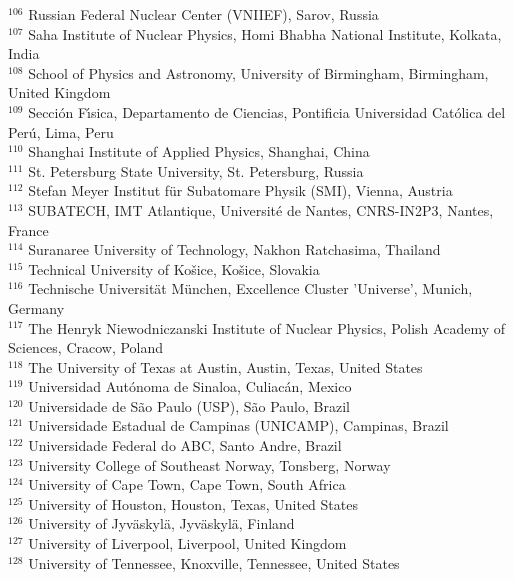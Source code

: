 \begin{flushleft}
$^{106}$ Russian Federal Nuclear Center (VNIIEF), Sarov, Russia\\
$^{107}$ Saha Institute of Nuclear Physics, Homi Bhabha National Institute, Kolkata, India\\
$^{108}$ School of Physics and Astronomy, University of Birmingham, Birmingham, United Kingdom\\
$^{109}$ Secci\'{o}n F\'{\i}sica, Departamento de Ciencias, Pontificia Universidad Cat\'{o}lica del Per\'{u}, Lima, Peru\\
$^{110}$ Shanghai Institute of Applied Physics, Shanghai, China\\
$^{111}$ St. Petersburg State University, St. Petersburg, Russia\\
$^{112}$ Stefan Meyer Institut f\"{u}r Subatomare Physik (SMI), Vienna, Austria\\
$^{113}$ SUBATECH, IMT Atlantique, Universit\'{e} de Nantes, CNRS-IN2P3, Nantes, France\\
$^{114}$ Suranaree University of Technology, Nakhon Ratchasima, Thailand\\
$^{115}$ Technical University of Ko\v{s}ice, Ko\v{s}ice, Slovakia\\
$^{116}$ Technische Universit\"{a}t M\"{u}nchen, Excellence Cluster 'Universe', Munich, Germany\\
$^{117}$ The Henryk Niewodniczanski Institute of Nuclear Physics, Polish Academy of Sciences, Cracow, Poland\\
$^{118}$ The University of Texas at Austin, Austin, Texas, United States\\
$^{119}$ Universidad Aut\'{o}noma de Sinaloa, Culiac\'{a}n, Mexico\\
$^{120}$ Universidade de S\~{a}o Paulo (USP), S\~{a}o Paulo, Brazil\\
$^{121}$ Universidade Estadual de Campinas (UNICAMP), Campinas, Brazil\\
$^{122}$ Universidade Federal do ABC, Santo Andre, Brazil\\
$^{123}$ University College of Southeast Norway, Tonsberg, Norway\\
$^{124}$ University of Cape Town, Cape Town, South Africa\\
$^{125}$ University of Houston, Houston, Texas, United States\\
$^{126}$ University of Jyv\"{a}skyl\"{a}, Jyv\"{a}skyl\"{a}, Finland\\
$^{127}$ University of Liverpool, Liverpool, United Kingdom\\
$^{128}$ University of Tennessee, Knoxville, Tennessee, United States\\

\end{flushleft}
